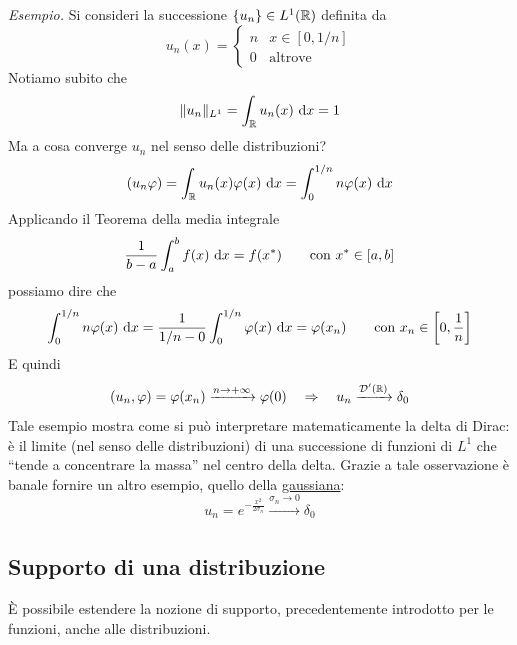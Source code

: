 \textit{Esempio.} Si consideri la successione $\{u_n\}\in L^1(\mathbb{R})$ definita da
\begin{equation*}
u_n(x)=\begin{cases}
n&x\in[0,1/n] \\
0&\text{altrove}
\end{cases}
\end{equation*}
Notiamo subito che 
\begin{equation*}
\Vert u_n\Vert_{L^1}=\int_{\mathbb{R}} u_n(x)\  \mathrm{d} x=1
\end{equation*}
Ma a cosa converge $u_n$ nel senso delle distribuzioni?
\begin{equation*}
(u_n\varphi)=\int_{\mathbb{R}} u_n(x)\varphi(x)\  \mathrm{d} x=\int_0^{1/n} n\varphi(x)\  \mathrm{d} x
\end{equation*}
Applicando il Teorema della media integrale
\begin{equation*}
\frac{1}{b-a}\int_a^b f(x)\  \mathrm{d} x=f(x^*) \qquad \text{con }x^*\in[a,b]
\end{equation*}
possiamo dire che
\begin{equation*}
\int_0^{1/n} n\varphi(x)\  \mathrm{d} x=\frac{1}{1/n-0}\int_0^{1/n}\varphi(x)\  \mathrm{d} x=\varphi(x_n)\qquad \text{con }x_n\in\left[0,\frac{1}{n}\right]
\end{equation*}
E quindi
\begin{equation*}
(u_n,\varphi)=\varphi(x_n)\xrightarrow[]{n\to+\infty}\varphi(0)\quad\Rightarrow\quad u_n\xrightarrow[]{\mathcal{D}'(\mathbb{R})}\delta_0
\end{equation*}
Tale esempio mostra come si può interpretare matematicamente la delta di Dirac: è il limite (nel senso delle distribuzioni) di una successione di funzioni di $L^1$ che ``tende a concentrare la massa'' nel centro della delta. Grazie a tale osservazione è banale fornire un altro esempio, quello della \underline{gaussiana}:
\begin{equation*}
u_n=e^{-\frac{x^2}{2\sigma_n}}\xrightarrow[]{\sigma_n\to0}\delta_0
\end{equation*} 


\subsection{Supporto di una distribuzione}

È possibile estendere la nozione di supporto, precedentemente introdotto per le funzioni, anche alle distribuzioni.

